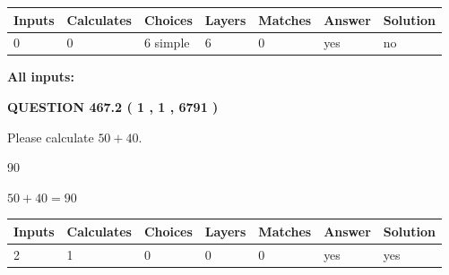 \documentclass[12pt]{article}
\begin{document}
 
   
   
   
   
\noindent\begin{tabular}{|l|l|l|l|l|l|l|}
 \hline
Inputs & Calculates & Choices & Layers & Matches & Answer & Solution \\ \hline
 0  & 
 0  & 
 6
  simple  
  & 
 6  & 
 0  & 
  yes & 
  no 
  \\ \hline
 \end{tabular}
   
   
   
   
\noindent{}
   
   
   
   
\noindent\vspace{0.1in}\hspace{-0.08in} {\textbf{\Large{All inputs: }}}
   
   
  
\vspace{0.2in}
  
{\textbf{\Large{QUESTION
467.2 
 ( 1 , 1 , 6791 )
}}}
  
  
 
Please calculate $ %
50 +  %
40 $.
 
 
 
\noindent{}
 
 

90
 
 
\noindent{}
 
 

 
 
 
\noindent{}
 
 

$ %
50 +  %
40=   %
90$
 
 
\noindent{}
 
 

 
   
   
   
   
\noindent\begin{tabular}{|l|l|l|l|l|l|l|}
 \hline
Inputs & Calculates & Choices & Layers & Matches & Answer & Solution \\ \hline
 2  & 
 1  & 
 0
  & 
 0  & 
 0  & 
  yes & 
  yes 
  \\ \hline
 \end{tabular}
   
\end{document}
